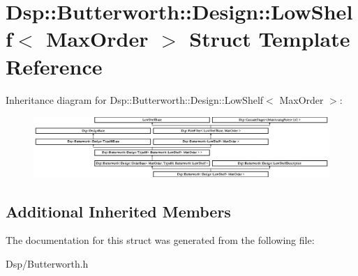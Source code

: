 \hypertarget{structDsp_1_1Butterworth_1_1Design_1_1LowShelf}{\section{Dsp\-:\-:Butterworth\-:\-:Design\-:\-:Low\-Shelf$<$ Max\-Order $>$ Struct Template Reference}
\label{structDsp_1_1Butterworth_1_1Design_1_1LowShelf}
}
Inheritance diagram for Dsp\-:\-:Butterworth\-:\-:Design\-:\-:Low\-Shelf$<$ Max\-Order $>$\-:\begin{figure}[H]
\begin{center}
\leavevmode
\includegraphics[height=2.314049cm]{structDsp_1_1Butterworth_1_1Design_1_1LowShelf}
\end{center}
\end{figure}
\subsection*{Additional Inherited Members}


The documentation for this struct was generated from the following file\-:\begin{DoxyCompactItemize}
\item 
Dsp/Butterworth.\-h\end{DoxyCompactItemize}
